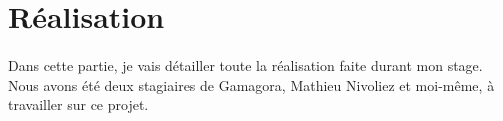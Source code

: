 \section{Réalisation}

\paragraph{}Dans cette partie, je vais détailler toute la réalisation faite durant mon stage. Nous avons été deux stagiaires de Gamagora, Mathieu Nivoliez et moi-même, à travailler
sur ce projet.













\newpage